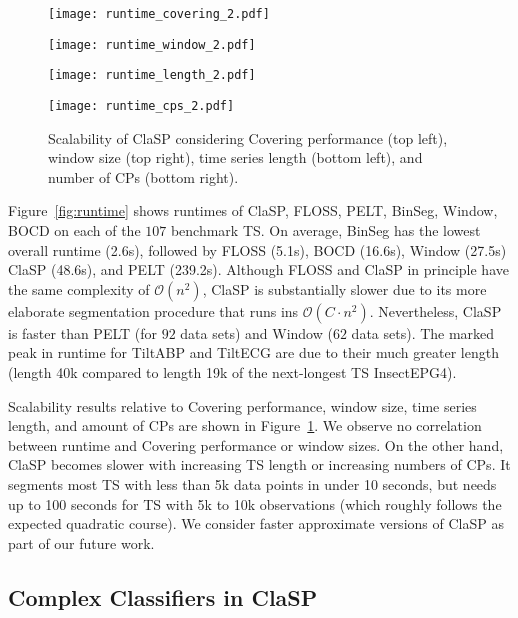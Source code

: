 \documentclass[pdflatex,sn-basic]{sn-jnl}
\begin{document}
\begin{figure}[t]
	\begin{minipage}{6cm}
        \texttt{[image: runtime\_covering\_2.pdf]}
	\end{minipage}
	\begin{minipage}{6cm}
        \texttt{[image: runtime\_window\_2.pdf]}
	\end{minipage}
	\begin{minipage}{6cm}
        \texttt{[image: runtime\_length\_2.pdf]}
	\end{minipage}
	\begin{minipage}{6cm}
        \texttt{[image: runtime\_cps\_2.pdf]}
	\end{minipage}
	\caption{Scalability of ClaSP considering Covering performance (top left), window size (top right), time series length (bottom left), and number of CPs (bottom right). \label{fig:scalability}
	}
\end{figure}

Figure~\ref{fig:runtime} shows runtimes of ClaSP, FLOSS, PELT, BinSeg, Window, BOCD on each of the $107$ benchmark TS. On average, BinSeg has the lowest overall runtime (2.6s), followed by FLOSS (5.1s), BOCD (16.6s), Window (27.5s) ClaSP (48.6s), and PELT (239.2s). Although FLOSS and ClaSP in principle have the same complexity of $\mathcal{O}(n^2)$, ClaSP is substantially slower due to its more elaborate segmentation procedure that runs ins $\mathcal{O}(C \cdot n^2)$. Nevertheless, ClaSP is faster than PELT (for $92$ data sets) and Window ($62$ data sets). The marked peak in runtime for TiltABP and TiltECG are due to their much greater length (length 40k compared to length 19k of the next-longest TS InsectEPG4). 

Scalability results relative to Covering performance, window size, time series length, and amount of CPs are shown in Figure~\ref{fig:scalability}. We observe no correlation between runtime and Covering performance or window sizes. On the other hand, ClaSP becomes slower with increasing TS length or increasing numbers of CPs. It segments most TS with less than 5k data points in under 10 seconds, but needs up to 100 seconds for TS with 5k to 10k observations (which roughly follows the expected quadratic course). We consider faster approximate versions of ClaSP as part of our future work. 


\subsection{Complex Classifiers in ClaSP} \label{sec:complex-classifiers}
\end{document}
